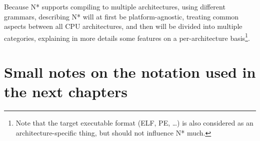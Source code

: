 \vspace{\baselineskip}

Because N* supports compiling to multiple architectures, using different grammars, describing N* will at first be platform-agnostic, treating common aspects between all CPU architectures, and then will be divided into multiple categories, explaining in more details some features on a per-architecture basis\footnote{Note that the target executable format (ELF, PE, \ldots) is also considered as an architecture-specific thing, but should not influence N* much.}.

\section*{Small notes on the notation used in the next chapters}\label{sec:nstar-abstract-notation}


